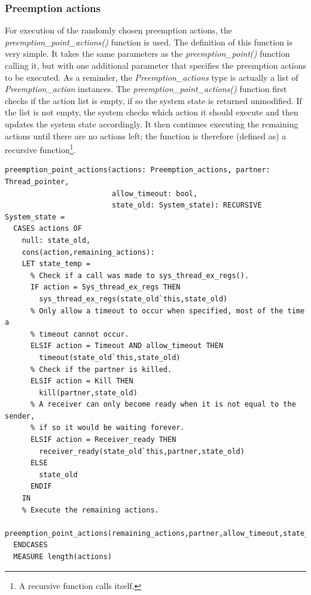 \subsubsection{Preemption actions}
For execution of the randomly chosen preemption actions, the \emph{preemption\_point\_actions()} function is used. The definition of this function is very simple. It takes the same parameters as the \emph{preemption\_point()} function calling it, but with one additional parameter that specifies the preemption actions to be executed. As a reminder, the \emph{Preemption\_actions} type is actually a list of \emph{Preemption\_action} instances. The \emph{preemption\_point\_actions()} function first checks if the action list is empty, if so the system state is returned unmodified. If the list is not empty, the system checks which action it should execute and then updates the system state accordingly. It then continues executing the remaining actions until there are no actions left; the function is therefore (defined as) a recursive function\footnote{A recursive function calls itself.}.

\lstset{language=PVS}
\begin{lstlisting}[caption={PVS: \emph{preemption\_point\_actions()} function.}]
% Execute a list of preemption point actions.
preemption_point_actions(actions: Preemption_actions, partner: Thread_pointer,
                         allow_timeout: bool, 
                         state_old: System_state): RECURSIVE System_state =
  CASES actions OF
    null: state_old,
    cons(action,remaining_actions):
    LET state_temp = 
      % Check if a call was made to sys_thread_ex_regs().
      IF action = Sys_thread_ex_regs THEN
        sys_thread_ex_regs(state_old`this,state_old)
      % Only allow a timeout to occur when specified, most of the time a 
      % timeout cannot occur.
      ELSIF action = Timeout AND allow_timeout THEN
        timeout(state_old`this,state_old)
      % Check if the partner is killed.
      ELSIF action = Kill THEN
        kill(partner,state_old)
      % A receiver can only become ready when it is not equal to the sender,
      % if so it would be waiting forever.
      ELSIF action = Receiver_ready THEN
        receiver_ready(state_old`this,partner,state_old)
      ELSE
        state_old
      ENDIF
    IN
    % Execute the remaining actions.
    preemption_point_actions(remaining_actions,partner,allow_timeout,state_temp)
  ENDCASES
  MEASURE length(actions)
\end{lstlisting}


